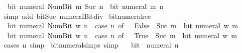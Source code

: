 \begin{isabellebody}
\ \ {\isacartoucheopen}bit\ {\isacharparenleft}{\kern0pt}numeral\ {\isacharparenleft}{\kern0pt}Num{\isachardot}{\kern0pt}Bit{}\ m{\isacharparenright}{\kern0pt}{\isacharparenright}{\kern0pt}\ {\isacharparenleft}{\kern0pt}Suc\ n{\isacharparenright}{\kern0pt}\ {\isasymlongleftrightarrow}\ bit\ {\isacharparenleft}{\kern0pt}numeral\ m{\isacharparenright}{\kern0pt}\ n{\isacartoucheclose}\isanewline
%
\isadelimproof
\ \ %
\endisadelimproof
%
\isatagproof
{}\isamarkupfalse%
\ {\isacharparenleft}{\kern0pt}simp\ add{\isacharcolon}{\kern0pt}\ bit{\isacharunderscore}{\kern0pt}Suc\ numeral{\isacharunderscore}{\kern0pt}Bit{}{\isacharunderscore}{\kern0pt}div{\isacharunderscore}{\kern0pt}{}{\isacharparenright}{\kern0pt}%
\endisatagproof
{\isafoldproof}%
%
\isadelimproof
\isanewline
%
\endisadelimproof
\isanewline
{}\isamarkupfalse%
\ bit{\isacharunderscore}{\kern0pt}numeral{\isacharunderscore}{\kern0pt}rec{\isacharcolon}{\kern0pt}\isanewline
\ \ {\isacartoucheopen}bit\ {\isacharparenleft}{\kern0pt}numeral\ {\isacharparenleft}{\kern0pt}Num{\isachardot}{\kern0pt}Bit{}\ w{\isacharparenright}{\kern0pt}{\isacharparenright}{\kern0pt}\ n\ {\isasymlongleftrightarrow}\ {\isacharparenleft}{\kern0pt}case\ n\ of\ {}\ {\isasymRightarrow}\ False\ {\isacharbar}{\kern0pt}\ Suc\ m\ {\isasymRightarrow}\ bit\ {\isacharparenleft}{\kern0pt}numeral\ w{\isacharparenright}{\kern0pt}\ m{\isacharparenright}{\kern0pt}{\isacartoucheclose}\isanewline
\ \ {\isacartoucheopen}bit\ {\isacharparenleft}{\kern0pt}numeral\ {\isacharparenleft}{\kern0pt}Num{\isachardot}{\kern0pt}Bit{}\ w{\isacharparenright}{\kern0pt}{\isacharparenright}{\kern0pt}\ n\ {\isasymlongleftrightarrow}\ {\isacharparenleft}{\kern0pt}case\ n\ of\ {}\ {\isasymRightarrow}\ True\ {\isacharbar}{\kern0pt}\ Suc\ m\ {\isasymRightarrow}\ bit\ {\isacharparenleft}{\kern0pt}numeral\ w{\isacharparenright}{\kern0pt}\ m{\isacharparenright}{\kern0pt}{\isacartoucheclose}\isanewline
%
\isadelimproof
\ \ %
\endisadelimproof
%
\isatagproof
{}\isamarkupfalse%
\ {\isacharparenleft}{\kern0pt}cases\ n{\isacharsemicolon}{\kern0pt}\ simp{\isacharparenright}{\kern0pt}{\isacharplus}{\kern0pt}%
\endisatagproof
{\isafoldproof}%
%
\isadelimproof
\isanewline
%
\endisadelimproof
\isanewline
{}\isamarkupfalse%
\ bit{\isacharunderscore}{\kern0pt}numeral{\isacharunderscore}{\kern0pt}simps\ {\isacharbrackleft}{\kern0pt}simp{\isacharbrackright}{\kern0pt}{\isacharcolon}{\kern0pt}\isanewline
\ \ {\isacartoucheopen}{\isasymnot}\ bit\ {}\ {\isacharparenleft}{\kern0pt}numeral\ n{\isacharparenright}{\kern0pt}{\isacartoucheclose}\isanewline

\end{isabellebody}
